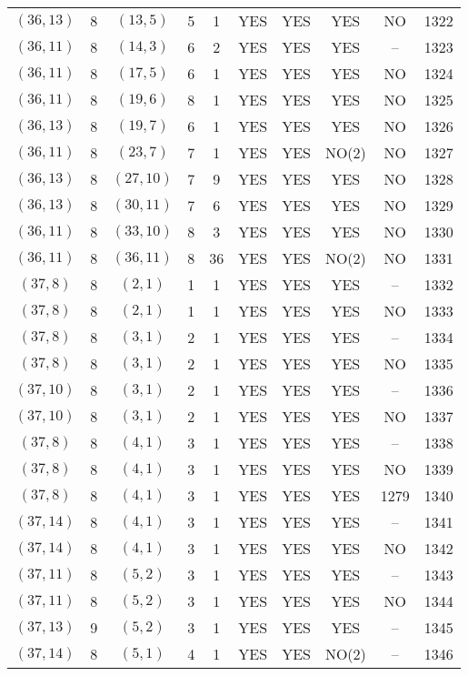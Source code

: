 \begin{longtable}{|c|c|c|c|c|c|c|c|c|c|}
$(36, 13)$ & 8 & $(13, 5)$ & 5 & 1 & YES & YES & YES & NO & 1322\\
$(36, 11)$ & 8 & $(14, 3)$ & 6 & 2 & YES & YES & YES & -- & 1323\\
$(36, 11)$ & 8 & $(17, 5)$ & 6 & 1 & YES & YES & YES & NO & 1324\\
$(36, 11)$ & 8 & $(19, 6)$ & 8 & 1 & YES & YES & YES & NO & 1325\\
$(36, 13)$ & 8 & $(19, 7)$ & 6 & 1 & YES & YES & YES & NO & 1326\\
$(36, 11)$ & 8 & $(23, 7)$ & 7 & 1 & YES & YES & NO(2) & NO & 1327\\
$(36, 13)$ & 8 & $(27, 10)$ & 7 & 9 & YES & YES & YES & NO & 1328\\
$(36, 13)$ & 8 & $(30, 11)$ & 7 & 6 & YES & YES & YES & NO & 1329\\
$(36, 11)$ & 8 & $(33, 10)$ & 8 & 3 & YES & YES & YES & NO & 1330\\
$(36, 11)$ & 8 & $(36, 11)$ & 8 & 36 & YES & YES & NO(2) & NO & 1331\\
$(37, 8)$ & 8 & $(2, 1)$ & 1 & 1 & YES & YES & YES & -- & 1332\\
$(37, 8)$ & 8 & $(2, 1)$ & 1 & 1 & YES & YES & YES & NO & 1333\\
$(37, 8)$ & 8 & $(3, 1)$ & 2 & 1 & YES & YES & YES & -- & 1334\\
$(37, 8)$ & 8 & $(3, 1)$ & 2 & 1 & YES & YES & YES & NO & 1335\\
$(37, 10)$ & 8 & $(3, 1)$ & 2 & 1 & YES & YES & YES & -- & 1336\\
$(37, 10)$ & 8 & $(3, 1)$ & 2 & 1 & YES & YES & YES & NO & 1337\\
$(37, 8)$ & 8 & $(4, 1)$ & 3 & 1 & YES & YES & YES & -- & 1338\\
$(37, 8)$ & 8 & $(4, 1)$ & 3 & 1 & YES & YES & YES & NO & 1339\\
$(37, 8)$ & 8 & $(4, 1)$ & 3 & 1 & YES & YES & YES & 1279 & 1340\\
$(37, 14)$ & 8 & $(4, 1)$ & 3 & 1 & YES & YES & YES & -- & 1341\\
$(37, 14)$ & 8 & $(4, 1)$ & 3 & 1 & YES & YES & YES & NO & 1342\\
$(37, 11)$ & 8 & $(5, 2)$ & 3 & 1 & YES & YES & YES & -- & 1343\\
$(37, 11)$ & 8 & $(5, 2)$ & 3 & 1 & YES & YES & YES & NO & 1344\\
$(37, 13)$ & 9 & $(5, 2)$ & 3 & 1 & YES & YES & YES & -- & 1345\\
$(37, 14)$ & 8 & $(5, 1)$ & 4 & 1 & YES & YES & NO(2) & -- & 1346\\

\end{longtable}
